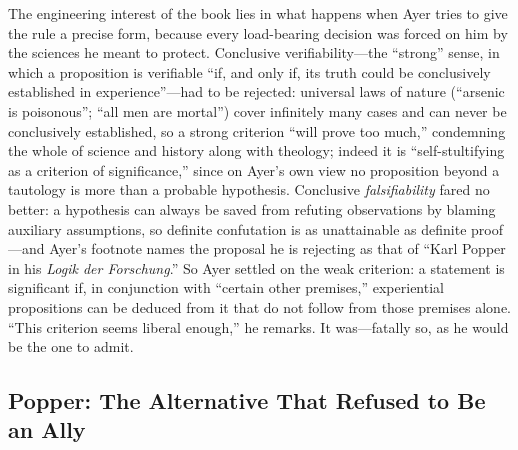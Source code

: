 The engineering interest of the book lies in what happens when Ayer tries to give the rule a precise form, because every load-bearing decision was forced on him by the sciences he meant to protect. Conclusive verifiability---the ``strong'' sense, in which a proposition is verifiable ``if, and only if, its truth could be conclusively established in experience''---had to be rejected: universal laws of nature (``arsenic is poisonous''; ``all men are mortal'') cover infinitely many cases and can never be conclusively established, so a strong criterion ``will prove too much,'' condemning the whole of science and history along with theology; indeed it is ``self-stultifying as a criterion of significance,'' since on Ayer's own view no proposition beyond a tautology is more than a probable hypothesis. Conclusive \emph{falsifiability} fared no better: a hypothesis can always be saved from refuting observations by blaming auxiliary assumptions, so definite confutation is as unattainable as definite proof---and Ayer's footnote names the proposal he is rejecting as that of ``Karl Popper in his \emph{Logik der Forschung}.'' So Ayer settled on the weak criterion: a statement is significant if, in conjunction with ``certain other premises,'' experiential propositions can be deduced from it that do not follow from those premises alone. ``This criterion seems liberal enough,'' he remarks. It was---fatally so, as he would be the one to admit.

\subsection{Popper: The Alternative That Refused to Be an Ally}

